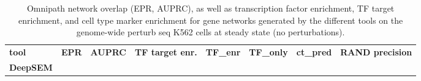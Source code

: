 \begin{longtable}[H]{@{}
  >{\raggedright\arraybackslash}p{}
  >{\raggedright\arraybackslash}p{}
  >{\raggedright\arraybackslash}p{}
  >{\raggedright\arraybackslash}p{}
  >{\raggedright\arraybackslash}p{}
  >{\raggedright\arraybackslash}p{}
  >{\raggedright\arraybackslash}p{}
  >{\raggedright\arraybackslash}p{}@{}}
\caption[Omnipath benchmark results on the genome-wide perturb-seq dataset]{Omnipath network overlap (EPR, AUPRC), as well as transcription factor enrichment, TF target enrichment, and cell type marker enrichment for gene networks generated by the different tools on the genome-wide perturb seq K562 cells at steady state (no perturbations).}\label{tab:s8-omnipath-gwps}\\
\toprule\noalign{}
\begin{minipage}[b]{\linewidth}\centering
\textbf{tool}
\end{minipage} & \begin{minipage}[b]{\linewidth}\centering
\textbf{EPR}
\end{minipage} & \begin{minipage}[b]{\linewidth}\centering
\textbf{AUPRC}
\end{minipage} & \begin{minipage}[b]{\linewidth}\centering
\textbf{TF target enr.}
\end{minipage} & \begin{minipage}[b]{\linewidth}\raggedright
\textbf{TF\_enr}
\end{minipage} & \begin{minipage}[b]{\linewidth}\raggedright
\textbf{TF\_only}
\end{minipage} & \begin{minipage}[b]{\linewidth}\raggedright
\textbf{ct\_pred}
\end{minipage} & \begin{minipage}[b]{\linewidth}\raggedright
\textbf{RAND precision}
\end{minipage} \\
\begin{minipage}[b]{\linewidth}\centering
\textbf{DeepSEM}
\end{minipage} & \begin{minipage}[b]{\linewidth}\centering

\end{minipage}
\end{longtable}
